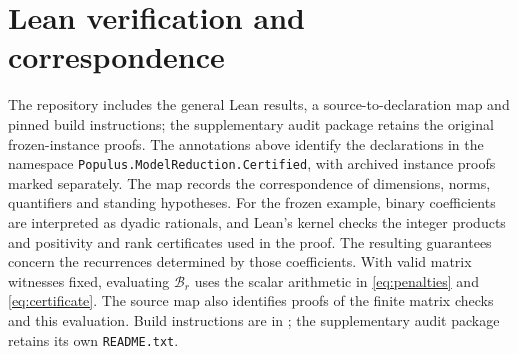\documentclass{l4dc2027}
\begin{document}
\section{Lean verification and correspondence}\label{app:lean}
The repository includes the general Lean results, a source-to-declaration map and pinned build instructions; the supplementary audit package retains the original frozen-instance proofs.
The annotations above identify the declarations in the namespace \texttt{Populus.ModelReduction.Certified}, with archived instance proofs marked separately.
The map records the correspondence of dimensions, norms, quantifiers and standing hypotheses.
For the frozen example, binary coefficients are interpreted as dyadic rationals, and Lean's kernel checks the integer products and positivity and rank certificates used in the proof.
The resulting guarantees concern the recurrences determined by those coefficients.
With valid matrix witnesses fixed, evaluating \mbox{$\mathcal B_r$} uses the scalar arithmetic in \eqref{eq:penalties} and \eqref{eq:certificate}.
The source map also identifies proofs of the finite matrix checks and this evaluation.
Build instructions are in ; the supplementary audit package retains its own \texttt{README.txt}.
\end{document}
